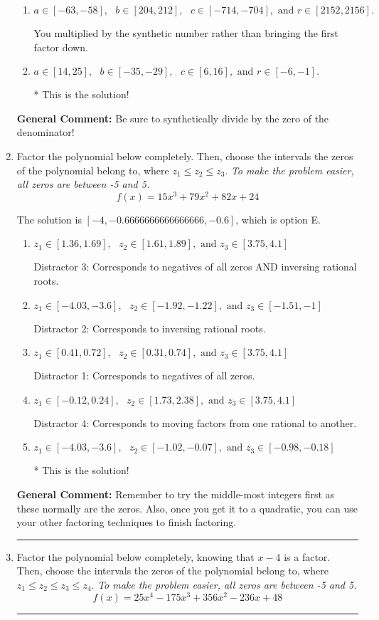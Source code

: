 \documentclass{extbook}[14pt]
\newcommand{\litem}[1]{\item #1

\rule{\textwidth}{0.4pt}}
\begin{document}
\begin{enumerate}
{\begin{enumerate}[label=\Alph*.]
 You divided by the opposite of the factor AND multiplied the first factor rather than just bringing it down.
\item \( a \in [-63, -58], \text{   } b \in [204, 212], \text{   } c \in [-714, -704], \text{   and   } r \in [2152, 2156]. \)

 You multiplied by the synthetic number rather than bringing the first factor down.
\item \( a \in [14, 25], \text{   } b \in [-35, -29], \text{   } c \in [6, 16], \text{   and   } r \in [-6, -1]. \)

* This is the solution!
\end{enumerate}

\textbf{General Comment:} Be sure to synthetically divide by the zero of the denominator!
}
\litem{
Factor the polynomial below completely. Then, choose the intervals the zeros of the polynomial belong to, where $z_1 \leq z_2 \leq z_3$. \textit{To make the problem easier, all zeros are between -5 and 5.}
\[ f(x) = 15x^{3} +79 x^{2} +82 x + 24 \]

The solution is \( [-4, -0.6666666666666666, -0.6] \), which is option E.\begin{enumerate}[label=\Alph*.]
\item \( z_1 \in [1.36, 1.69], \text{   }  z_2 \in [1.61, 1.89], \text{   and   } z_3 \in [3.75, 4.1] \)

 Distractor 3: Corresponds to negatives of all zeros AND inversing rational roots.
\item \( z_1 \in [-4.03, -3.6], \text{   }  z_2 \in [-1.92, -1.22], \text{   and   } z_3 \in [-1.51, -1] \)

 Distractor 2: Corresponds to inversing rational roots.
\item \( z_1 \in [0.41, 0.72], \text{   }  z_2 \in [0.31, 0.74], \text{   and   } z_3 \in [3.75, 4.1] \)

 Distractor 1: Corresponds to negatives of all zeros.
\item \( z_1 \in [-0.12, 0.24], \text{   }  z_2 \in [1.73, 2.38], \text{   and   } z_3 \in [3.75, 4.1] \)

 Distractor 4: Corresponds to moving factors from one rational to another.
\item \( z_1 \in [-4.03, -3.6], \text{   }  z_2 \in [-1.02, -0.07], \text{   and   } z_3 \in [-0.98, -0.18] \)

* This is the solution!
\end{enumerate}

\textbf{General Comment:} Remember to try the middle-most integers first as these normally are the zeros. Also, once you get it to a quadratic, you can use your other factoring techniques to finish factoring.
}
\litem{
Factor the polynomial below completely, knowing that $x-4$ is a factor. Then, choose the intervals the zeros of the polynomial belong to, where $z_1 \leq z_2 \leq z_3 \leq z_4$. \textit{To make the problem easier, all zeros are between -5 and 5.}
\[ f(x) = 25x^{4} -175 x^{3} +356 x^{2} -236 x + 48 \]

}
\end{enumerate}
\end{document}
